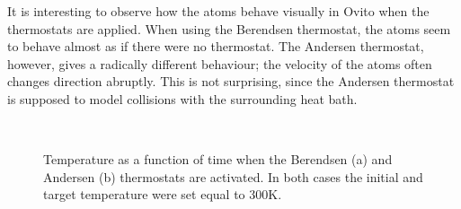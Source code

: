 \documentclass[12pt]{article}
\begin{document}
It is interesting to observe how the atoms behave visually in Ovito when the thermostats are applied. When using the Berendsen thermostat, the atoms seem to behave almost as if there were no
thermostat. The Andersen thermostat, however, gives a radically different behaviour; the velocity of the atoms often changes direction abruptly. This is not surprising, since the Andersen
thermostat is supposed to model collisions with the surrounding heat bath.


\begin{figure}[!ht]
    \begin{center}
        \hspace{5mm}
        \\ 
    \end{center}
    \caption{Temperature as a function of time when the Berendsen (a) and Andersen (b) thermostats are activated. In both cases the initial and target temperature were set equal to 300K.}
    \label{fig:tempThermostats}
\end{figure}



\end{document}
